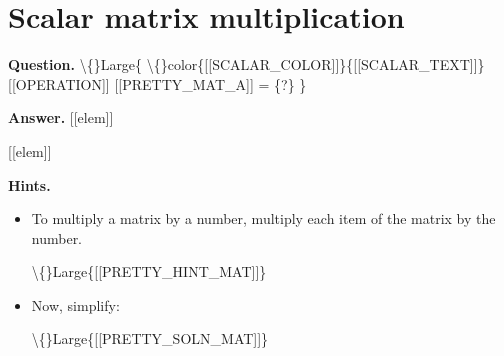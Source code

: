 \documentclass{article}
\begin{document}
\section*{Scalar matrix multiplication}
\textbf{Question.} \textbackslash\{\}Large\{
                \textbackslash\{\}color\{[[SCALAR\_COLOR]]\}\{[[SCALAR\_TEXT]]\}
                [[OPERATION]]
                [[PRETTY\_MAT\_A]] = \{?\}
            \}

\textbf{Answer.} [[elem]]
                
                
                    [[elem]]

\textbf{Hints.}
\begin{itemize}
  \item To multiply a matrix by a number, multiply each item of the matrix by the number.
            
                \textbackslash\{\}Large\{[[PRETTY\_HINT\_MAT]]\}
  \item Now, simplify:
            
                \textbackslash\{\}Large\{[[PRETTY\_SOLN\_MAT]]\}
\end{itemize}
\end{document}
